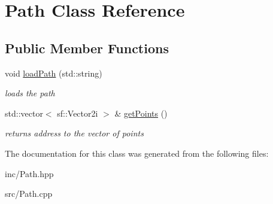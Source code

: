 \hypertarget{class_path}{\section{Path Class Reference}
\label{class_path}
}
\subsection*{Public Member Functions}
\begin{DoxyCompactItemize}
\item 
\hypertarget{class_path_a37f12357df358f4b388c6ac490c2b4de}{void \hyperlink{class_path_a37f12357df358f4b388c6ac490c2b4de}{load\+Path} (std\+::string)}\label{class_path_a37f12357df358f4b388c6ac490c2b4de}

\begin{DoxyCompactList}\small\item\em loads the path \end{DoxyCompactList}\item 
\hypertarget{class_path_aeabbd417b7a9b19560c5fd2d3efc7dcd}{std\+::vector$<$ sf\+::\+Vector2i $>$ \& \hyperlink{class_path_aeabbd417b7a9b19560c5fd2d3efc7dcd}{get\+Points} ()}\label{class_path_aeabbd417b7a9b19560c5fd2d3efc7dcd}

\begin{DoxyCompactList}\small\item\em returns address to the vector of points \end{DoxyCompactList}\end{DoxyCompactItemize}


The documentation for this class was generated from the following files\+:\begin{DoxyCompactItemize}
\item 
inc/Path.\+hpp\item 
src/Path.\+cpp\end{DoxyCompactItemize}
